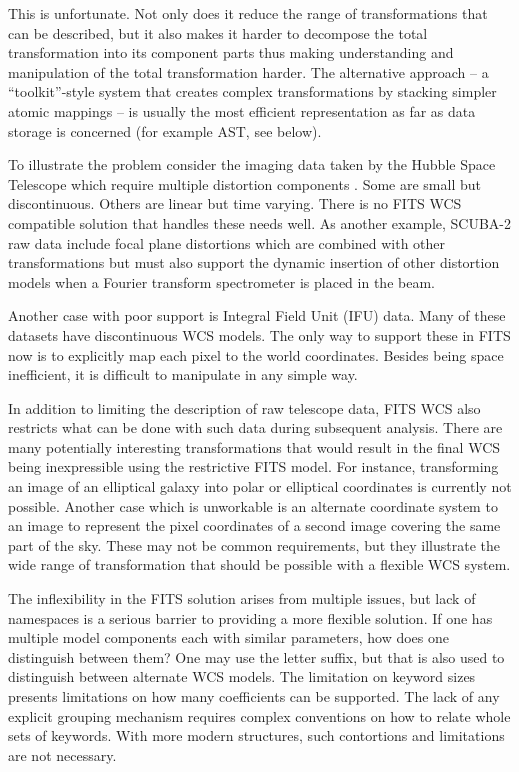 \documentclass[final,authoryear,5p,times,twocolumn]{elsarticle}
\begin{document}
{{This is unfortunate. Not only does it reduce the range of
transformations that can be described, but it also makes it harder to
decompose the total transformation into its component parts thus making
understanding and manipulation of the total transformation harder. The
alternative approach -- a ``toolkit''-style system that creates complex
transformations by stacking simpler atomic mappings -- is usually the
most efficient representation as far as data storage is concerned
(for example AST, see below).


To illustrate the problem consider the imaging data taken by the
Hubble Space Telescope which require multiple distortion components \citep[see e.g.,][]{2013ASPC..475...49H}.
Some are small but discontinuous. Others are linear but time varying.
There is no FITS WCS compatible solution that handles these needs well.
As another example, SCUBA-2 raw data \citep[see
e.g.,][]{2013MNRAS.430.2513H} include focal plane distortions which are
combined with other transformations but must also support the dynamic
insertion of other distortion models when a Fourier transform
spectrometer \citep{2010SPIE.7741E..67G} is placed in the beam.


Another case with poor support is Integral Field Unit (IFU) data.
Many of these datasets
have discontinuous WCS models. The only way to support these in FITS
now is to explicitly map each pixel to the world coordinates. Besides
being space inefficient, it is difficult to manipulate in any simple
way.


In addition to limiting the description of raw telescope data, FITS
WCS also restricts what can be done with such data during subsequent
analysis. There are many potentially interesting transformations that
would result in the final WCS being inexpressible using the
restrictive FITS model. For instance, transforming an image of an
elliptical galaxy into polar or elliptical coordinates is currently not possible. Another
case which is unworkable is an alternate coordinate system to an image to
represent the pixel coordinates of a second image covering the same
part of the sky.  These may not be common requirements, but they
illustrate the wide range of transformation that should be possible
with a flexible WCS system.


The inflexibility in the FITS solution arises from multiple issues,
but lack of namespaces is a serious barrier to providing a more
flexible solution. If one has multiple model components each with
similar parameters, how does one distinguish between them? One may use
the letter suffix, but that is also used to distinguish between
alternate WCS models. The limitation on keyword sizes presents
limitations on how many coefficients can be supported. The lack of any
explicit grouping mechanism requires complex conventions on how to
relate whole sets of keywords. With more modern structures, such
contortions and limitations are not necessary.


}}
\end{document}

